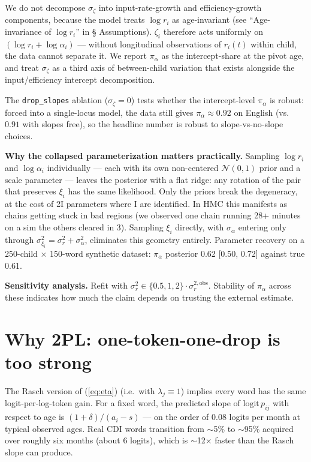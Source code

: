 \documentclass[11pt]{article}
\newcommand{\Norm}{\mathcal{N}}
\begin{document}
We do not decompose \(\sigma_\zeta\) into input-rate-growth and
efficiency-growth components, because the model treats \(\log r_i\)
as age-invariant (see ``Age-invariance of \(\log r_i\)'' in §
Assumptions). \(\zeta_i\) therefore acts uniformly on
\((\log r_i + \log \alpha_i)\) — without longitudinal observations of
\(r_i(t)\) within child, the data cannot separate it. We report
\(\pi_\alpha\) as the intercept-share at the pivot age, and treat
\(\sigma_\zeta\) as a third axis of between-child variation that
exists alongside the input/efficiency intercept decomposition.

The \texttt{drop\_slopes} ablation (\(\sigma_\zeta = 0\)) tests
whether the intercept-level \(\pi_\alpha\) is robust: forced into a
single-locus model, the data still gives \(\pi_\alpha \approx 0.92\)
on English (vs.\ \(0.91\) with slopes free), so the headline number
is robust to slope-vs-no-slope choices.

\textbf{Why the collapsed parameterization matters practically.} Sampling
\(\log r_i\) and \(\log \alpha_i\) individually — each with its own
non-centered \(\Norm(0, 1)\) prior and a scale parameter — leaves the
posterior with a flat ridge: any rotation of the pair that preserves
\(\xi_i\) has the same likelihood. Only the priors break the degeneracy,
at the cost of 2I parameters where I are identified. In HMC this
manifests as chains getting stuck in bad regions (we observed one chain
running 28+ minutes on a sim the others cleared in 3). Sampling
\(\xi_i\) directly, with \(\sigma_\alpha\) entering only through
\(\sigma_{\xi_i}^2 = \sigma_r^2 + \sigma_\alpha^2\), eliminates this
geometry entirely. Parameter recovery on a 250-child \(\times\) 150-word
synthetic dataset: \(\pi_\alpha\) posterior 0.62 [0.50, 0.72] against
true 0.61.

\textbf{Sensitivity analysis.} Refit with
\(\sigma_r^2 \in \{0.5, 1, 2\} \cdot \sigma_r^{2,\text{obs}}\).
Stability of \(\pi_\alpha\) across these indicates how much the claim
depends on trusting the external estimate.

\section{Why 2PL: one-token-one-drop is too strong}
\label{sec:twopl}

The Rasch version of (\ref{eq:eta}) (i.e.\ with \(\lambda_j \equiv 1\))
implies every word has the same logit-per-log-token gain. For a fixed
word, the predicted slope of \(\mathrm{logit}\,p_{ij}\) with respect to
age is \((1+\delta)/(a_i - s)\) — on the order of \(0.08\) logits per
month at typical observed ages. Real CDI words transition from
\(\sim\)5\% to \(\sim\)95\% acquired over roughly six months (about 6
logits), which is \(\sim\)12\(\times\) faster than the Rasch slope can
produce.
\end{document}

